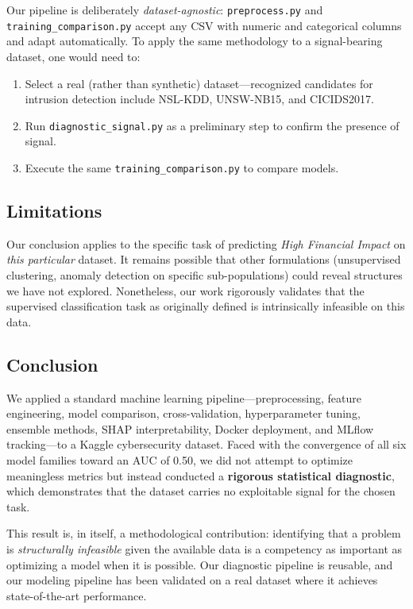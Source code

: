 \documentclass[a4paper,12pt]{article}
\begin{document}
Our pipeline is deliberately \emph{dataset-agnostic}: \texttt{preprocess.py} and \texttt{training\_comparison.py} accept any CSV with numeric and categorical columns and adapt automatically. To apply the same methodology to a signal-bearing dataset, one would need to:
\begin{enumerate}[leftmargin=2cm]
    \item Select a real (rather than synthetic) dataset---recognized candidates for intrusion detection include NSL-KDD, UNSW-NB15, and CICIDS2017.
    \item Run \texttt{diagnostic\_signal.py} as a preliminary step to confirm the presence of signal.
    \item Execute the same \texttt{training\_comparison.py} to compare models.
\end{enumerate}

\subsection{Limitations}

Our conclusion applies to the specific task of predicting \emph{High Financial Impact} on \emph{this particular} dataset. It remains possible that other formulations (unsupervised clustering, anomaly detection on specific sub-populations) could reveal structures we have not explored. Nonetheless, our work rigorously validates that the supervised classification task as originally defined is intrinsically infeasible on this data.

\subsection{Conclusion}

We applied a standard machine learning pipeline---preprocessing, feature engineering, model comparison, cross-validation, hyperparameter tuning, ensemble methods, SHAP interpretability, Docker deployment, and MLflow tracking---to a Kaggle cybersecurity dataset. Faced with the convergence of all six model families toward an AUC of 0.50, we did not attempt to optimize meaningless metrics but instead conducted a \textbf{rigorous statistical diagnostic}, which demonstrates that the dataset carries no exploitable signal for the chosen task.

This result is, in itself, a methodological contribution: identifying that a problem is \emph{structurally infeasible} given the available data is a competency as important as optimizing a model when it is possible. Our diagnostic pipeline is reusable, and our modeling pipeline has been validated on a real dataset where it achieves state-of-the-art performance.
\end{document}
